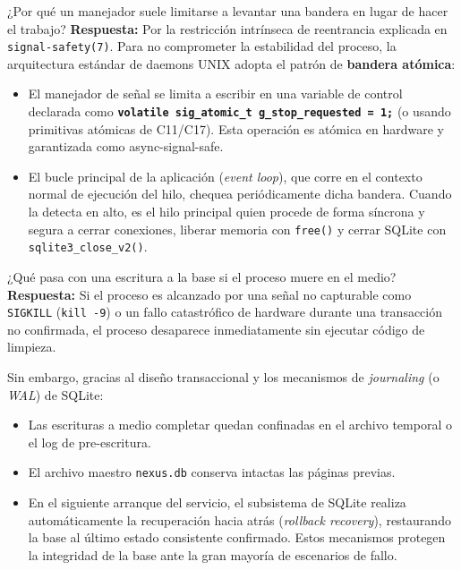 \documentclass[10pt,a4paper]{article}
\begin{document}
\begin{pregunta}{¿Por qué un manejador suele limitarse a levantar una bandera en lugar de hacer el trabajo?}
    \textbf{Respuesta:} Por la restricción intrínseca de reentrancia explicada en \texttt{signal-safety(7)}. Para no comprometer la estabilidad del proceso, la arquitectura estándar de daemons UNIX adopta el patrón de \textbf{bandera atómica}:
    \begin{itemize}[leftmargin=*]
        \item El manejador de señal se limita a escribir en una variable de control declarada como \textbf{\texttt{volatile sig\_atomic\_t g\_stop\_requested = 1;}} (o usando primitivas atómicas de C11/C17). Esta operación es atómica en hardware y garantizada como async-signal-safe.
        \item El bucle principal de la aplicación (\textit{event loop}), que corre en el contexto normal de ejecución del hilo, chequea periódicamente dicha bandera. Cuando la detecta en alto, es el hilo principal quien procede de forma síncrona y segura a cerrar conexiones, liberar memoria con \texttt{free()} y cerrar SQLite con \texttt{sqlite3\_close\_v2()}.
    \end{itemize}
\end{pregunta}

\begin{pregunta}{¿Qué pasa con una escritura a la base si el proceso muere en el medio?}
    \textbf{Respuesta:} Si el proceso es alcanzado por una señal no capturable como \texttt{SIGKILL} (\texttt{kill -9}) o un fallo catastrófico de hardware durante una transacción no confirmada, el proceso desaparece inmediatamente sin ejecutar código de limpieza.
    
    Sin embargo, gracias al diseño transaccional y los mecanismos de \textit{journaling} (o \textit{WAL}) de SQLite:
    \begin{itemize}[leftmargin=*]
        \item Las escrituras a medio completar quedan confinadas en el archivo temporal o el log de pre-escritura.
        \item El archivo maestro \texttt{nexus.db} conserva intactas las páginas previas.
        \item En el siguiente arranque del servicio, el subsistema de SQLite realiza automáticamente la recuperación hacia atrás (\textit{rollback recovery}), restaurando la base al último estado consistente confirmado. Estos mecanismos protegen la integridad de la base ante la gran mayoría de escenarios de fallo.
    \end{itemize}
\end{pregunta}
\end{document}

